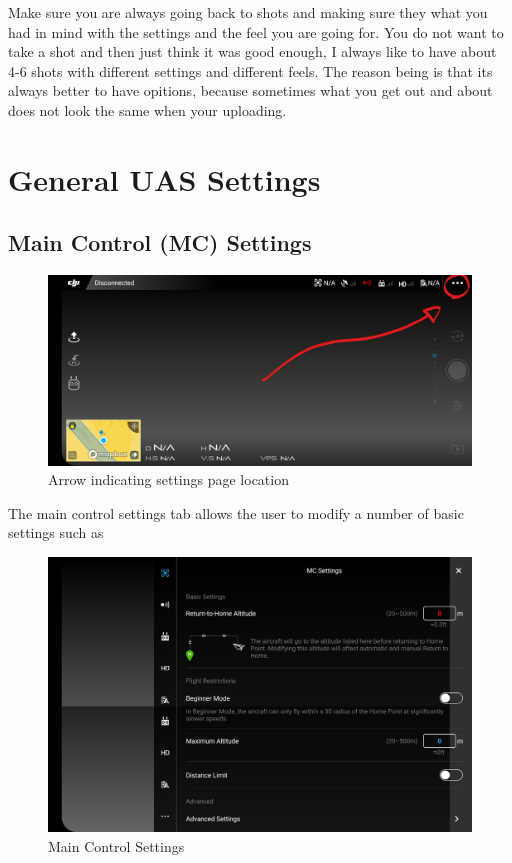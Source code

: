 \documentclass[
]{book}
\begin{document}
Make sure you are always going back to shots and making sure they what you had in mind with the settings and the feel you are going for. You do not want to take a shot and then just think it was good enough, I always like to have about 4-6 shots with different settings and different feels. The reason being is that its always better to have opitions, because sometimes what you get out and about does not look the same when your uploading.

\hypertarget{ch-uas-settings.Rmd}{%
\chapter{General UAS Settings}\label{ch-uas-settings.Rmd}}

\hypertarget{main-control-mc-settings}{%
\section{Main Control (MC) Settings}\label{main-control-mc-settings}}

\begin{figure}
\centering
\includegraphics{images/DJI-SettingsPage.jpg}
\caption{Arrow indicating settings page location}
\end{figure}

The main control settings tab allows the user to modify a number of basic settings such as

\begin{figure}
\centering
\includegraphics{images/MC/DJI-MC-SettingsPage.jpg}
\caption{Main Control Settings}
\end{figure}
\end{document}
